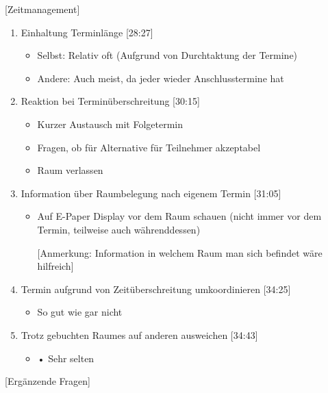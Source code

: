 [Zeitmanagement]

\begin{enumerate}

    \item Einhaltung Terminlänge [28:27]
    \begin{itemize}
        \item Selbst: Relativ oft (Aufgrund von Durchtaktung der Termine)
        \item Andere: Auch meist, da jeder wieder Anschlusstermine hat
    \end{itemize}
    
    \item Reaktion bei Terminüberschreitung [30:15]
    \begin{itemize}
        \item Kurzer Austausch mit Folgetermin
        \item Fragen, ob für Alternative für Teilnehmer akzeptabel 
        \item Raum verlassen
    \end{itemize}
    
    \item Information über Raumbelegung nach eigenem Termin [31:05]
    \begin{itemize}
        \item Auf E-Paper Display vor dem Raum schauen (nicht immer vor dem Termin, teilweise auch währenddessen)
        \item[] [Anmerkung: Information in welchem Raum man sich befindet wäre hilfreich]
    \end{itemize}
    
    \item Termin aufgrund von Zeitüberschreitung umkoordinieren [34:25]
    \begin{itemize}
        \item So gut wie gar nicht
    \end{itemize}
    
    \item Trotz gebuchten Raumes auf anderen ausweichen [34:43]
    \begin{itemize}
        \item •	Sehr selten
    \end{itemize}
    
\end{enumerate}

[Ergänzende Fragen]

